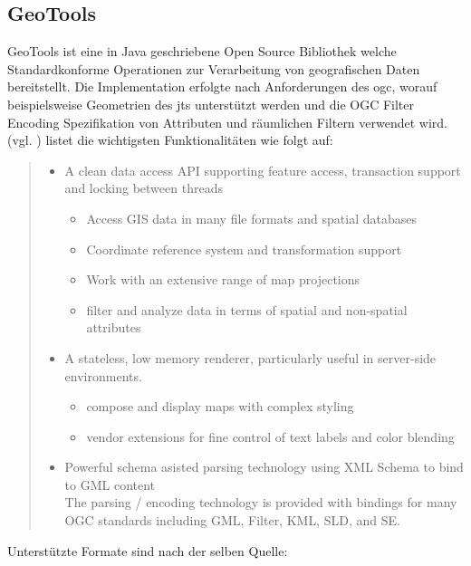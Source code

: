 \subsection{GeoTools}
\label{geotools}
GeoTools ist eine in Java geschriebene Open Source Bibliothek welche Standardkonforme Operationen zur Verarbeitung von geografischen Daten bereitstellt.
Die Implementation erfolgte nach Anforderungen des \Gls{ogc}, worauf beispielsweise Geometrien des \Gls{jts} unterstützt werden und die OGC Filter Encoding Spezifikation von Attributen und räumlichen Filtern verwendet wird.(vgl. \cite{website:geotools})
\cite{website:geotools} listet die wichtigsten Funktionalitäten wie folgt auf:
\begin{quote}
\begin{itemize}
\item A clean data access API supporting feature access, transaction support and locking between threads
\begin{itemize}
\item Access GIS data in many file formats and spatial databases
\item Coordinate reference system and transformation support
\item Work with an extensive range of map projections
\item filter and analyze data in terms of spatial and non-spatial attributes
\end{itemize}
\item A stateless, low memory renderer, particularly useful in server-side environments.
\begin{itemize}
\item compose and display maps with complex styling
\item vendor extensions for fine control of text labels and color blending
\end{itemize}
\item Powerful schema asisted parsing technology using XML Schema to bind to GML content\\
The parsing / encoding technology is provided with bindings for many OGC standards including GML, Filter, KML, SLD, and SE.
\end{itemize}
\end{quote}
Unterstützte Formate sind nach der selben Quelle:
